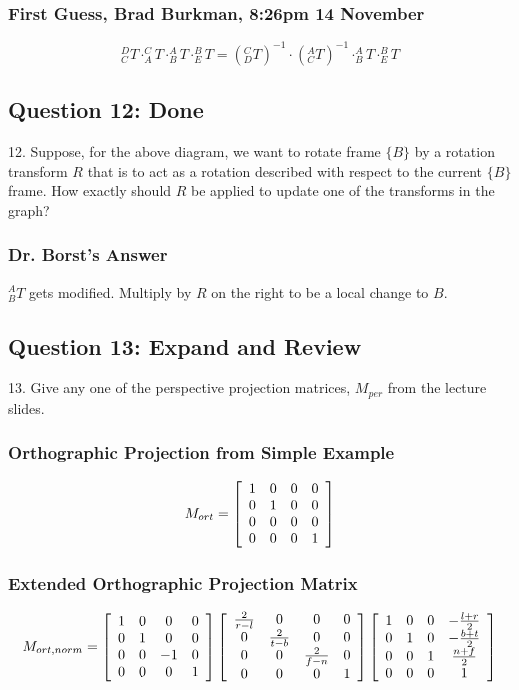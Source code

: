 \documentclass[11pt]{article}
\begin{document}
\begin{spacing}{1.2}
\subsubsection{First Guess, Brad Burkman, 8:26pm 14 November}

$$
	^D_CT \cdot 
	^C_AT \cdot 
	^A_BT \cdot 
	^B_ET = 
	\left( ^C_DT \right)^{-1} \cdot
	\left( ^A_CT \right)^{-1} \cdot
	^A_BT \cdot 
	^B_ET
	$$
	
\subsection{Question 12:  Done}
12.  Suppose, for the above diagram, we want to rotate frame $\{B\}$ by a rotation transform $R$ that is to act as a rotation described with respect to the  current $\{B\}$ frame.  How exactly should $R$ be applied to update one of the transforms in the graph?

\subsubsection{Dr. Borst's Answer}

$^A_BT$ gets modified.  Multiply by $R$ on the right to be a local change to $B$.  


\subsection{Question 13:  Expand and Review}
13.  Give any one of the perspective projection matrices, $M_{per}$ from the lecture slides.  

\subsubsection{Orthographic Projection from Simple Example}

$$M_{ort} = 
\left[
	\begin{array}{cccc}
		1 & 0 & 0 & 0 \cr
		0 & 1 & 0 & 0 \cr
		0 & 0 & 0 & 0 \cr
		0 & 0 & 0 & 1 \cr
	\end{array}
\right]
$$

\subsubsection{Extended Orthographic Projection Matrix}

$$M_{ort,norm} = 
\left[
	\begin{array}{cccc}
		1 & 0 & 0 & 0 \cr
		0 & 1 & 0 & 0 \cr
		0 & 0 & -1 & 0 \cr
		0 & 0 & 0 & 1 \cr
	\end{array}
\right]
\left[
	\begin{array}{cccc}
		\frac{2}{r-l} & 0 & 0 & 0 \cr
		0 & \frac{2}{t-b} & 0 & 0 \cr
		0 & 0 & \frac{2}{f-n} & 0 \cr
		0 & 0 & 0 & 1 \cr
	\end{array}
\right]
\left[
	\begin{array}{cccc}
		1 & 0 & 0  & -\frac{l+r}{2} \cr
		0 & 1 & 0 & -\frac{b+t}{2} \cr
		0 & 0 & 1 & \frac{n+f}{2} \cr
		0 & 0 & 0 & 1 \cr
	\end{array}
\right]
$$


\end{spacing}
\end{document}
